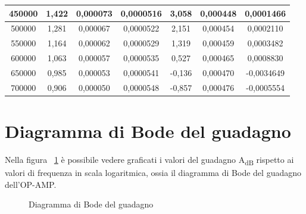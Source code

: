\begin{table}[!ht]
\begin{tabular}{|c|c|c|c|c|c|c|}
        450000 & 1,422 & 0,000073 & 0,0000516 & 3,058 & 0,000448 & 0,0001466 \\ \hline
        500000 & 1,281 & 0,000067 & 0,0000522 & 2,151 & 0,000454 & 0,0002110 \\ \hline
        550000 & 1,164 & 0,000062 & 0,0000529 & 1,319 & 0,000459 & 0,0003482 \\ \hline
        600000 & 1,063 & 0,000057 & 0,0000535 & 0,527 & 0,000465 & 0,0008830 \\ \hline
        650000 & 0,985 & 0,000053 & 0,0000541 & -0,136 & 0,000470 & -0,0034649 \\ \hline
        700000 & 0,906 & 0,000050 & 0,0000548 & -0,857 & 0,000476 & -0,0005554 \\ \hline
    \end{tabular}
\end{table}

\section{Diagramma di Bode del guadagno}
Nella figura ~\ref{fig:Bode} è possibile vedere graficati i valori del guadagno A\textsubscript{dB} rispetto ai valori di frequenza in scala logaritmica, ossia il diagramma di Bode del guadagno dell'OP-AMP. 

\begin{figure}
    \centering
    \caption{Diagramma di Bode del guadagno}
    \label{fig:Bode}
\end{figure}

